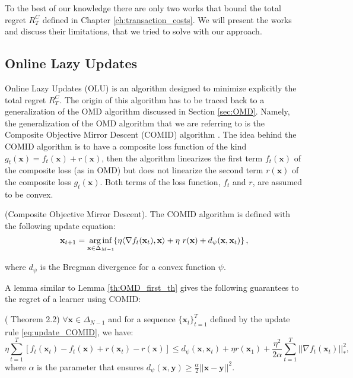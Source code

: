 To the best of our knowledge there are only two works that bound the total regret $R_T^C$ defined in Chapter \ref{ch:transaction_costs}. We will present the works and discuss their limitations, that we tried to solve with our approach.

\subsection{Online Lazy Updates}\label{sec:OLU}

Online Lazy Updates (OLU) \cite{das2013online} is an algorithm designed to minimize explicitly the total regret $R_T^C$. The origin of this algorithm has to be traced back to a generalization of the OMD algorithm discussed in Section \ref{sec:OMD}. Namely, the generalization of the OMD algorithm that we are referring to is the Composite Objective Mirror Descent (COMID) algorithm \cite{duchi2010composite}. The idea behind the COMID algorithm is to have a composite loss function of the kind $g_t(\mathbf x)=f_t(\mathbf x) + r(\mathbf x)$, then the algorithm linearizes the first term $f_t(\mathbf x)$ of the composite loss (as in OMD) but does not linearize the second term $r(\mathbf x)$ of the composite loss $g_t(\mathbf x)$. Both terms of the loss function, $f_t$ and $r$, are assumed to be convex.

\begin{definition}(Composite Objective Mirror Descent).\label{def:COMID}
The COMID algorithm is defined with the following update equation:
\begin{equation}\label{eq:update_COMID}
    \mathbf{x}_{t+1}=\arginf\limits_{\mathbf{x} \in \Delta_{M-1}} \hspace{-0.1cm} \left\{ \eta \langle \nabla f_t(\mathbf{x}_t), \mathbf{x} \rangle + \eta \ r(\mathbf{x}) + d_\psi(\mathbf{x}, \mathbf{x}_t) \right\},
\end{equation}

where $d_\psi$ is the Bregman divergence for a convex function $\psi$. 

\end{definition}

A lemma similar to Lemma \ref{th:OMD_first_th} gives the following guarantees to the regret of a learner using COMID:

\begin{lemma}(\cite{duchi2010composite} Theorem 2.2)
$\forall \mathbf x\in\Delta_{N-1}$ and for a sequence $\{\mathbf x_t\}_{t=1}^T$ defined by the update rule \eqref{eq:update_COMID}, we have:
\begin{equation}
\eta\sum\limits_{t=1}^T[f_t(\mathbf x_t)-f_t(\mathbf x)+r(\mathbf x_t)-r(\mathbf x)]\le d_\psi(\mathbf x,\mathbf x_t)+\eta r(\mathbf x_1)+\frac{\eta^2}{2\alpha}\sum\limits_{t=1}^T||\nabla f_t(\mathbf x_t)||_*^2,
\end{equation} 
where $\alpha$ is the parameter that ensures $d_\psi(\mathbf x,\mathbf y)\ge \frac{\alpha}{2}||\mathbf x-\mathbf y||^2$.
\end{lemma}

